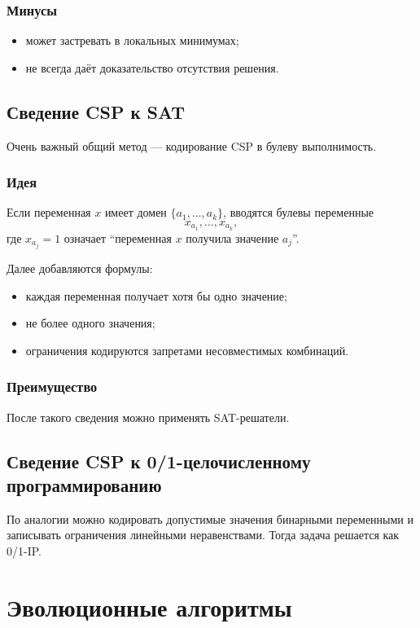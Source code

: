 \documentclass[12pt,a4paper]{article}
\theoremstyle{definition}
\theoremstyle{plain}
\begin{document}
\subsubsection{Минусы}
\begin{itemize}
\item может застревать в локальных минимумах;
\item не всегда даёт доказательство отсутствия решения.
\end{itemize}

\subsection{Сведение CSP к SAT}
Очень важный общий метод --- кодирование CSP в булеву выполнимость.

\subsubsection{Идея}
Если переменная $x$ имеет домен $\{a_1,\dots,a_k\}$, вводятся булевы переменные
\[
x_{a_1},\dots,x_{a_k},
\]
где $x_{a_j}=1$ означает ``переменная $x$ получила значение $a_j$''.

Далее добавляются формулы:
\begin{itemize}
\item каждая переменная получает хотя бы одно значение;
\item не более одного значения;
\item ограничения кодируются запретами несовместимых комбинаций.
\end{itemize}

\subsubsection{Преимущество}
После такого сведения можно применять SAT-решатели.

\subsection{Сведение CSP к 0/1-целочисленному программированию}
По аналогии можно кодировать допустимые значения бинарными переменными и записывать ограничения линейными неравенствами. Тогда задача решается как 0/1-IP.

\section{Эволюционные алгоритмы}
\end{document}

